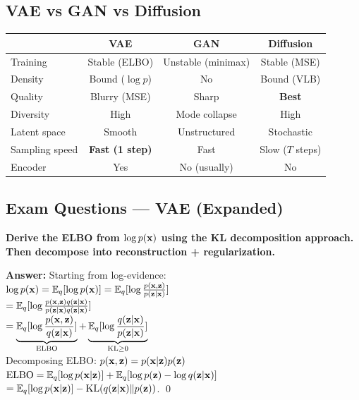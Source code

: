 \subsection{VAE vs GAN vs Diffusion}
\begin{center}\small
\begin{tabular}{lccc}\toprule
& \textbf{VAE} & \textbf{GAN} & \textbf{Diffusion} \\\midrule
Training & Stable (ELBO) & Unstable (minimax) & Stable (MSE) \\
Density & Bound ($\log p$) & No & Bound (VLB) \\
Quality & Blurry (MSE) & Sharp & \textbf{Best} \\
Diversity & High & Mode collapse & High \\
Latent space & Smooth & Unstructured & Stochastic \\
Sampling speed & \textbf{Fast (1 step)} & Fast & Slow ($T$ steps) \\
Encoder & Yes & No (usually) & No \\
\bottomrule
\end{tabular}
\end{center}

\subsection{Exam Questions — VAE (Expanded)}

\begin{examq}
\textbf{Derive the ELBO from $\log p(\mathbf{x})$ using the KL decomposition approach. Then decompose into reconstruction + regularization.}

\textbf{Answer:}
Starting from log-evidence:\\
$\log p(\mathbf{x}) = \mathbb{E}_q[\log p(\mathbf{x})] = \mathbb{E}_q[\log \frac{p(\mathbf{x},\mathbf{z})}{p(\mathbf{z}|\mathbf{x})}]$\\
$= \mathbb{E}_q[\log \frac{p(\mathbf{x},\mathbf{z})q(\mathbf{z}|\mathbf{x})}{p(\mathbf{z}|\mathbf{x})q(\mathbf{z}|\mathbf{x})}]$\\
$= \underbrace{\mathbb{E}_q[\log \frac{p(\mathbf{x},\mathbf{z})}{q(\mathbf{z}|\mathbf{x})}]}_{\text{ELBO}} + \underbrace{\mathbb{E}_q[\log\frac{q(\mathbf{z}|\mathbf{x})}{p(\mathbf{z}|\mathbf{x})}]}_{\text{KL} \geq 0}$\\
Decomposing ELBO: $p(\mathbf{x},\mathbf{z}) = p(\mathbf{x}|\mathbf{z})p(\mathbf{z})$\\
$\text{ELBO} = \mathbb{E}_q[\log p(\mathbf{x}|\mathbf{z})] + \mathbb{E}_q[\log p(\mathbf{z}) - \log q(\mathbf{z}|\mathbf{x})]$\\
$= \mathbb{E}_q[\log p(\mathbf{x}|\mathbf{z})] - \text{KL}(q(\mathbf{z}|\mathbf{x})\|p(\mathbf{z}))$. \qed
\end{examq}

